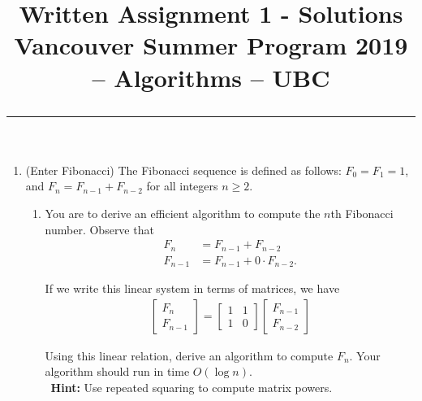 \documentclass[11pt]{article}
\title{
  Written Assignment 1 - Solutions\\
  \large
  Vancouver Summer Program 2019 -- Algorithms -- UBC \\
  \vspace*{0.2in} \hrule
}
\date{}
\begin{document}
\maketitle

\setlength{\baselineskip}{0.90\baselineskip}




\pagestyle{empty}

\vspace*{-0.75in}

 \begin{enumerate}
\item (Enter Fibonacci) The Fibonacci sequence is defined as follows: $F_{0} = F_{1} = 1$, and $F_{n} = F_{n-1} + F_{n-2}$ for all integers $n \geq 2$.
  \begin{enumerate}
      \item You are to derive an efficient algorithm to compute the $n$th Fibonacci number. Observe that 
\begin{align*}
  F_{n} & = F_{n-1} + F_{n-2}\\
  F_{n-1} & = F_{n-1} + 0 \cdot F_{n-2}.
\end{align*}

If we write this linear system in terms of matrices, we have
\begin{align*}
  \begin{bmatrix}
    F_{n} \\ 
  F_{n-1}
  \end{bmatrix} =
  \begin{bmatrix}
    1&1\\
    1 & 0
  \end{bmatrix}
\begin{bmatrix}
    F_{n-1} \\ 
  F_{n-2}
\end{bmatrix}
\end{align*}

Using this linear relation, derive an algorithm to compute $F_{n}$. Your algorithm should run in time $O (\log n)$. \\\ \textbf{Hint:} Use repeated squaring to compute matrix powers.\\


\end{enumerate}
\end{enumerate}
\end{document}
